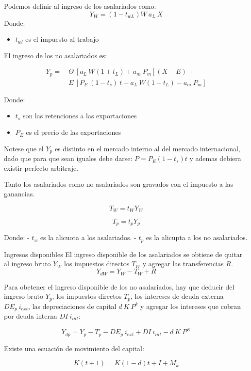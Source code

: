 \documentclass[
  ignorenonframetext,
]{beamer}
\begin{document}
\begin{frame}{}
\label{section-5}
Podemos definir al ingreso de los asalariados como: \[
Y_W=(1-t_{wL})W\ a_L\ X
\tag{15}
\] Donde:

\begin{itemize}
  \item[\textbullet] $t_{wl}$ es el impuesto al trabajo
\end{itemize}

El ingreso de los no asalariados es:

\[
\begin{aligned}
Y_p=\ &\Theta\ [a_L\ W (1+t_L)+ a_m\ P_m](X-E)+\\ 
&E\ [P_E\ (1-t_s)\ t- a_L\ W (1-t_L)- a_m\  P_m]
\end{aligned} \tag{16}
\]

Donde:

\begin{itemize}
  \item $t_{s}$ son las retenciones a las exportaciones
  \item $P_{E}$ es el precio de las exportaciones
\end{itemize}
\end{frame}

\begin{frame}{}
\label{section-6}
Notese que el \(Y_p\) es distinto en el mercado interno al del mercado
internacional, dado que para que sean iguales debe darse:
\(P=P_E (1-t_s)t\) y ademas debiera existir perfecto arbitraje.

Tanto los asalariados como no asalariados son gravados con el impuesto a
las ganancias.

\[
T_W=t_W Y_W
\tag{17}
\]

\[
T_p=t_p Y_p
\tag{17}
\]

Donde: - \(t_w\) es la alicuota a los asalariados. - \(t_p\) es la
alicupta a los no asalariados.
\end{frame}

\begin{frame}{}
\label{section-7}
\begin{block}{Ingresos disponibles}
\label{ingresos-disponibles}
El ingreso disponible de los asalariados se obtiene de quitar al ingreso
bruto \(Y_W\) los impuestos directos \(T_W\) y agregar las
transferencias \(R\). \[
Y_{dW}= Y_W -T_W + R
\tag{18}
\]

Para obetener el ingreso disponible de los no asalariados, hay que
deducir del ingreso bruto \(Y_p\), los impuestos directos \(T_p\), los
intereses de deuda externa \(DE_p\  i_{ext}\), las depreciaciones de
capital \(d\ K\ P^k\) y agregar los intereses que cobran por deuda
interna \(DI\ i_{int}\):

\[
Y_{dp} = Y_p - T_p - DE_p\ i_{ext} + DI\ i_{int} - d\ K\ P^K
\tag{19}
\]
\end{block}
\end{frame}

\begin{frame}{}
\label{section-8}
Existe una ecuación de movimiento del capital:

\[
K (t + 1) = K (1-d) t +I + M_k
\tag{20}
\]
\end{frame}
\end{document}
